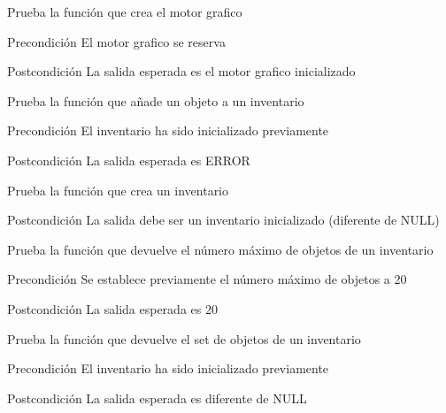\begin{DoxyRefList}
\item[\label{test__test000113}%
\hypertarget{test__test000113}{}%
Global \hyperlink{graphic__engine__test_8c_a26e135026a1961e607d0d05ddce4fb2f}{test1\-\_\-graphic\-\_\-engine\-\_\-create} ()]Prueba la función que crea el motor grafico \begin{DoxyPrecond}{Precondición}
El motor grafico se reserva 
\end{DoxyPrecond}
\begin{DoxyPostcond}{Postcondición}
La salida esperada es el motor grafico inicializado  
\end{DoxyPostcond}

\item[\label{test__test000115}%
\hypertarget{test__test000115}{}%
Global \hyperlink{inventory__test_8c_abddf20d7b11937754a88fb57c9d74292}{test1\-\_\-inventory\-\_\-add\-\_\-object} ()]Prueba la función que añade un objeto a un inventario \begin{DoxyPrecond}{Precondición}
El inventario ha sido inicializado previamente 
\end{DoxyPrecond}
\begin{DoxyPostcond}{Postcondición}
La salida esperada es E\-R\-R\-O\-R  
\end{DoxyPostcond}

\item[\label{test__test000114}%
\hypertarget{test__test000114}{}%
Global \hyperlink{inventory__test_8c_a33638f1a88ae16ab8d6bee00145b82b8}{test1\-\_\-inventory\-\_\-create} ()]Prueba la función que crea un inventario \begin{DoxyPostcond}{Postcondición}
La salida debe ser un inventario inicializado (diferente de N\-U\-L\-L)  
\end{DoxyPostcond}

\item[\label{test__test000121}%
\hypertarget{test__test000121}{}%
Global \hyperlink{inventory__test_8c_a17c03f02b989bb00b04155c12fe2af9d}{test1\-\_\-inventory\-\_\-get\-\_\-max} ()]Prueba la función que devuelve el número máximo de objetos de un inventario \begin{DoxyPrecond}{Precondición}
Se establece previamente el número máximo de objetos a 20 
\end{DoxyPrecond}
\begin{DoxyPostcond}{Postcondición}
La salida esperada es 20  
\end{DoxyPostcond}

\item[\label{test__test000126}%
\hypertarget{test__test000126}{}%
Global \hyperlink{inventory__test_8c_ac38fe4f7cdf9fa3972e975ee07caf876}{test1\-\_\-inventory\-\_\-get\-\_\-set} ()]Prueba la función que devuelve el set de objetos de un inventario \begin{DoxyPrecond}{Precondición}
El inventario ha sido inicializado previamente 
\end{DoxyPrecond}
\begin{DoxyPostcond}{Postcondición}
La salida esperada es diferente de N\-U\-L\-L  
\end{DoxyPostcond}


\end{DoxyRefList}
